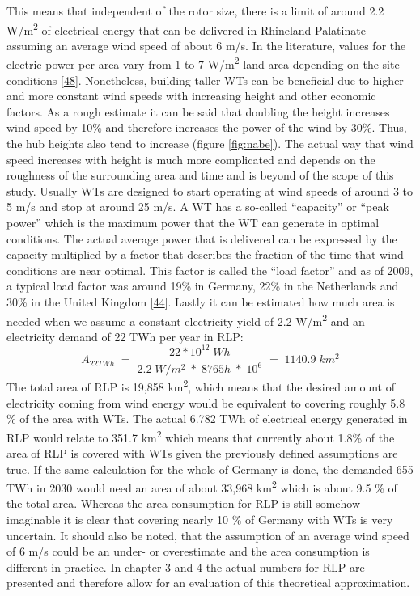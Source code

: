 \documentclass[a4paper,11pt]{article}
\begin{document}
This means that independent of the rotor size, there is a limit of around 2.2 W/m\textsuperscript{2} of electrical energy that can be delivered in Rhineland-Palatinate assuming an average wind speed of about 6 m/s. In the literature, values for the electric power per area vary from 1 to 7 W/m\textsuperscript{2} land area depending on the site conditions {[}\protect\hyperlink{ref-SvenLinow.2020}{48}{]}. Nonetheless, building taller WTs can be beneficial due to higher and more constant wind speeds with increasing height and other economic factors. As a rough estimate it can be said that doubling the height increases wind speed by 10\% and therefore increases the power of the wind by 30\%. Thus, the hub heights also tend to increase (figure \ref{fig:nabe}). The actual way that wind speed increases with height is much more complicated and depends on the roughness of the surrounding area and time and is beyond of the scope of this study. Usually WTs are designed to start operating at wind speeds of around 3 to 5 m/s and stop at around 25 m/s. A WT has a so-called ``capacity'' or ``peak power'' which is the maximum power that the WT can generate in optimal conditions. The actual average power that is delivered can be expressed by the capacity multiplied by a factor that describes the fraction of the time that wind conditions are near optimal. This factor is called the ``load factor'' and as of 2009, a typical load factor was around 19\% in Germany, 22\% in the Netherlands and 30\% in the United Kingdom {[}\protect\hyperlink{ref-DavidJCMacKay.2009}{44}{]}. Lastly it can be estimated how much area is needed when we assume a constant electricity yield of 2.2 W/m\textsuperscript{2} and an electricity demand of 22 TWh per year in RLP:
\begin{equation}
A_{22TWh}\;=\;\frac{22 * 10^{12}\; Wh}{2.2\;W/m^2\; *\; 8765h\; *\; 10^6}\;=\;1140.9\;km^2
\end{equation}
The total area of RLP is 19,858 km\textsuperscript{2}, which means that the desired amount of electricity coming from wind energy would be equivalent to covering roughly 5.8 \% of the area with WTs. The actual 6.782 TWh of electrical energy generated in RLP would relate to 351.7 km\textsuperscript{2} which means that currently about 1.8\% of the area of RLP is covered with WTs given the previously defined assumptions are true. If the same calculation for the whole of Germany is done, the demanded 655 TWh in 2030 would need an area of about 33,968 km\textsuperscript{2} which is about 9.5 \% of the total area. Whereas the area consumption for RLP is still somehow imaginable it is clear that covering nearly 10 \% of Germany with WTs is very uncertain. It should also be noted, that the assumption of an average wind speed of 6 m/s could be an under- or overestimate and the area consumption is different in practice. In chapter 3 and 4 the actual numbers for RLP are presented and therefore allow for an evaluation of this theoretical approximation.
\end{document}
